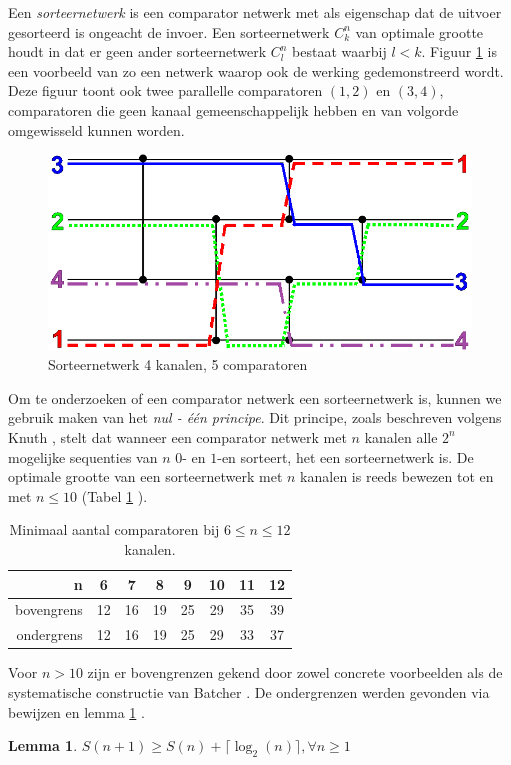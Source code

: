 \documentclass{article}
\newtheorem{lemma}{Lemma}
\begin{document}
Een \textit{sorteernetwerk} is een comparator netwerk met als eigenschap dat de uitvoer gesorteerd is ongeacht de invoer.
Een sorteernetwerk $C^n_k$ van optimale grootte houdt in dat er geen ander sorteernetwerk $C^n_l$ bestaat waarbij $l < k$. %
Figuur \ref{Werking} is een voorbeeld van zo een netwerk waarop ook de werking gedemonstreerd wordt.
Deze figuur toont ook twee parallelle comparatoren $(1,2)$ en $(3,4)$, comparatoren die geen kanaal gemeenschappelijk hebben en van volgorde omgewisseld kunnen worden.
\begin{figure}[h!]
\centering
\includegraphics[scale=0.275]{NetworkTransparent.png} 
\caption{Sorteernetwerk 4 kanalen, 5 comparatoren}
\label{Werking}
\end{figure}
Om te onderzoeken of een comparator netwerk een sorteernetwerk is, kunnen we gebruik maken van het \textit{nul - \'e\'en principe}. 
Dit principe, zoals beschreven volgens Knuth \cite{Knuth3}, stelt dat wanneer een comparator netwerk met $n$ kanalen alle $2^n$ mogelijke sequenties van $n$ $0$- en $1$-en sorteert, het een sorteernetwerk is.
De optimale grootte van een sorteernetwerk met $n$ kanalen is reeds bewezen tot en met $n \leq 10$ (Tabel \ref{tabel1} \cite{sortingNetworksSize2014}).
\begin{table}[h!]
\centering
\begin{tabular}{r|c|c|c|c|c|c|c}
n & 6 & 7 & 8 & 9 & 10 & 11 & 12\\ 
\hline 
bovengrens & 12 & 16 & 19 & 25 & 29 & 35 & 39\\ 
\hline 
ondergrens & 12 & 16 & 19 & 25& 29 & 33 & 37\\
\end{tabular} 
\caption{Minimaal aantal comparatoren bij $6 \leq n \leq 12$ kanalen.}
\label{tabel1}
\end{table}
Voor $n > 10$ zijn er bovengrenzen gekend door zowel concrete voorbeelden als de systematische constructie van Batcher \cite{sortingNetworksApplications}. 
De ondergrenzen werden gevonden via bewijzen en lemma \ref{lemma1} \cite{Voorhis1972}.
\begin{lemma}
$S(n+1) \geq S(n) + \lceil \log_2(n) \rceil, \forall n \geq 1$
\label{lemma1}
\end{lemma}
\end{document}
